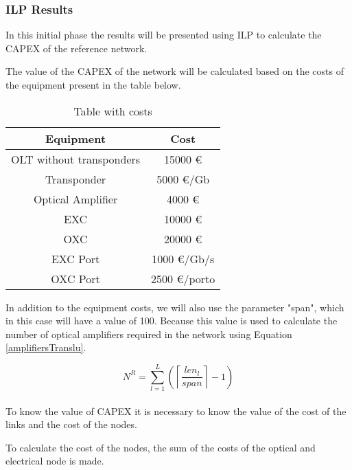 \subsubsection{ILP Results}

In this initial phase the results will be presented using ILP to calculate the CAPEX of the reference network.

The value of the CAPEX of the network will be calculated based on the costs of the equipment present in the table below.
\begin{table}[h!]
\centering
\begin{tabular}{|| c | c||}
 \hline
 Equipment & Cost \\
 \hline\hline
 OLT without transponders & 15000 \euro \\
 Transponder & 5000 \euro/Gb \\
 Optical Amplifier & 4000 \euro \\
 EXC & 10000 \euro \\
 OXC & 20000 \euro \\
 EXC Port & 1000 \euro /Gb/s\\
 OXC Port & 2500 \euro /porto \\
 \hline
\end{tabular}
\caption{Table with costs}
\label{table_cost3}
\end{table}

In addition to the equipment costs, we will also use the parameter "span", which in this case will have a value of 100.
Because this value is used to calculate the number of optical amplifiers required in the network using Equation \ref{amplifiersTranslu}.

\begin{equation}
N^R = \sum\limits_{l=1}^L\left(\left\lceil\frac{len_l}{span}\right\rceil-1\right)
\label{amplifiersTranslu}
\end{equation} \\

To know the value of CAPEX it is necessary to know the value of the cost of the links and the cost of the nodes.

To calculate the cost of the nodes, the sum of the costs of the optical and electrical node is made. %

	
